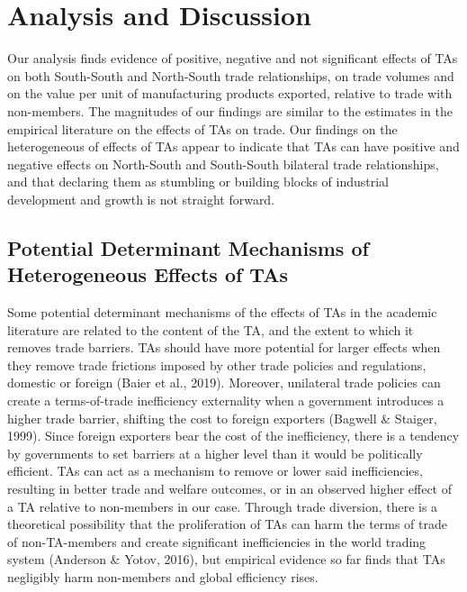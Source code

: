 \documentclass[12pt]{article}%
\begin{document}
\section{Analysis and Discussion}%
\label{sec:AnalysisandDiscussion}%
Our analysis finds evidence of positive, negative and not significant effects of TAs on both South{-}South and North{-}South trade relationships, on trade volumes and on the value per unit of manufacturing products exported, relative to trade with non{-}members. The magnitudes of our findings are similar to the estimates in the empirical literature on the effects of TAs on trade. Our findings on the heterogeneous of effects of TAs appear to indicate that TAs can have positive and negative effects on North{-}South and South{-}South bilateral trade relationships, and that declaring them as stumbling or building blocks of industrial development and growth is not straight forward.%
\subsection{Potential Determinant Mechanisms of Heterogeneous Effects of TAs }%
\label{subsec:PotentialDeterminantMechanismsofHeterogeneousEffectsofTAs}%
Some potential determinant mechanisms of the effects of TAs in the
academic literature are related to the content of the TA, and the extent
to which it removes trade barriers. TAs should have more potential for
larger effects when they remove trade frictions imposed by other trade
policies and regulations, domestic or foreign (Baier et al., 2019).
Moreover, unilateral trade policies can create a terms-of-trade
inefficiency externality when a government introduces a higher trade
barrier, shifting the cost to foreign exporters (Bagwell \& Staiger,
1999). Since foreign exporters bear the cost of the inefficiency, there
is a tendency by governments to set barriers at a higher level than it
would be politically efficient. TAs can act as a mechanism to remove or
lower said inefficiencies, resulting in better trade and welfare
outcomes, or in an observed higher effect of a TA relative to
non-members in our case. Through trade diversion, there is a theoretical
possibility that the proliferation of TAs can harm the terms of trade of
non-TA-members and create significant inefficiencies in the world
trading system (Anderson \& Yotov, 2016), but empirical evidence so far
finds that TAs negligibly harm non-members and global efficiency rises.
\end{document}
